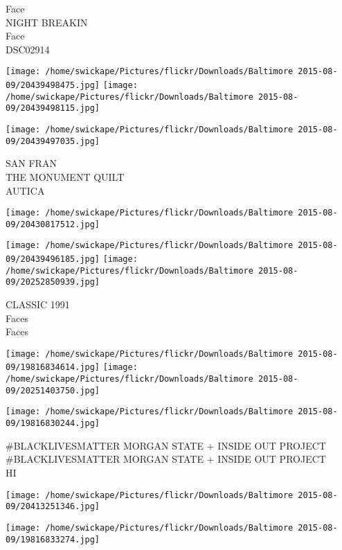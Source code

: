 \documentclass[10pt,letterpaper]{article}
\begin{document}
Face\\
NIGHT BREAKIN\\
Face\\
DSC02914\\
\pagebreak

\texttt{[image: /home/swickape/Pictures/flickr/Downloads/Baltimore 2015-08-09/20439498475.jpg]}
\texttt{[image: /home/swickape/Pictures/flickr/Downloads/Baltimore 2015-08-09/20439498115.jpg]}

\texttt{[image: /home/swickape/Pictures/flickr/Downloads/Baltimore 2015-08-09/20439497035.jpg]}

SAN FRAN\\
THE MONUMENT QUILT\\
AUTICA\\
\pagebreak

\texttt{[image: /home/swickape/Pictures/flickr/Downloads/Baltimore 2015-08-09/20430817512.jpg]}

\vspace{0.25in}
\texttt{[image: /home/swickape/Pictures/flickr/Downloads/Baltimore 2015-08-09/20439496185.jpg]}
\texttt{[image: /home/swickape/Pictures/flickr/Downloads/Baltimore 2015-08-09/20252850939.jpg]}

CLASSIC 1991\\
Faces\\
Faces\\
\pagebreak

\texttt{[image: /home/swickape/Pictures/flickr/Downloads/Baltimore 2015-08-09/19816834614.jpg]}
\texttt{[image: /home/swickape/Pictures/flickr/Downloads/Baltimore 2015-08-09/20251403750.jpg]}

\vspace{0.25in}
\texttt{[image: /home/swickape/Pictures/flickr/Downloads/Baltimore 2015-08-09/19816830244.jpg]}

\#BLACKLIVESMATTER MORGAN STATE + INSIDE OUT PROJECT\\
\#BLACKLIVESMATTER MORGAN STATE + INSIDE OUT PROJECT\\
HI\\
\pagebreak

\texttt{[image: /home/swickape/Pictures/flickr/Downloads/Baltimore 2015-08-09/20413251346.jpg]}

\vspace{0.25in}
\texttt{[image: /home/swickape/Pictures/flickr/Downloads/Baltimore 2015-08-09/19816833274.jpg]}
\end{document}
